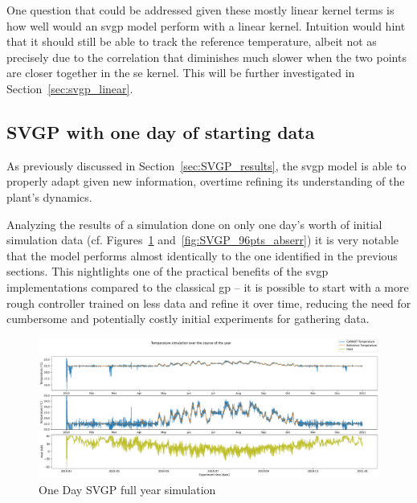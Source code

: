 One question that could be addressed given these mostly linear kernel terms is
how well would an \acrshort{svgp} model perform with a linear kernel.
Intuition would hint that it should still be able to track the reference
temperature, albeit not as precisely due to the correlation that diminishes much
slower when the two points are closer together in the \acrshort{se} kernel. This
will be further investigated in Section~\ref{sec:svgp_linear}.

\clearpage

\subsection{SVGP with one day of starting data}\label{sec:svgp_96pts}

As previously discussed in Section~\ref{sec:SVGP_results}, the \acrshort{svgp}
model is able to properly adapt given new information, overtime refining its
understanding of the plant's dynamics.

Analyzing the results of a simulation done on only one day's worth of initial
simulation data (cf. Figures~\ref{fig:SVGP_96pts_fullyear_simulation}
and~\ref{fig:SVGP_96pts_abserr}) it is very notable that the model performs
almost identically to the one identified in the previous sections. This
nightlights one of the practical benefits of the \acrshort{svgp} implementations
compared to the classical \acrlong{gp} -- it is possible to start with a more
rough controller trained on less data and refine it over time, reducing the need
for cumbersome and potentially costly initial experiments for gathering data.

\begin{figure}[ht]
    \centering
    \includegraphics[width =
    \textwidth]{Plots/6_SVGP_96pts_inf_window_12_averageYear_fullyear.pdf}
    \caption{One Day SVGP full year simulation}
    \label{fig:SVGP_96pts_fullyear_simulation}
\end{figure}

